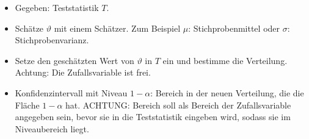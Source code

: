 \begin{itemize}
	\item Gegeben: Teststatistik $T$.
	\item Schätze $\vartheta$ mit einem Schätzer. Zum Beispiel $\mu$: Stichprobenmittel oder $\sigma$: Stichprobenvarianz.
	\item Setze den geschätzten Wert von $\vartheta$ in $T$ ein und bestimme die Verteilung. Achtung: Die Zufallsvariable ist frei. 
	\item Konfidenzintervall mit Niveau $1-\alpha$: Bereich in der neuen Verteilung, die die Fläche $1-\alpha$ hat. ACHTUNG: Bereich soll als Bereich der Zufallsvariable angegeben sein, bevor sie in die Teststatistik eingeben wird, sodass sie im Niveaubereich liegt.
\end{itemize}












































